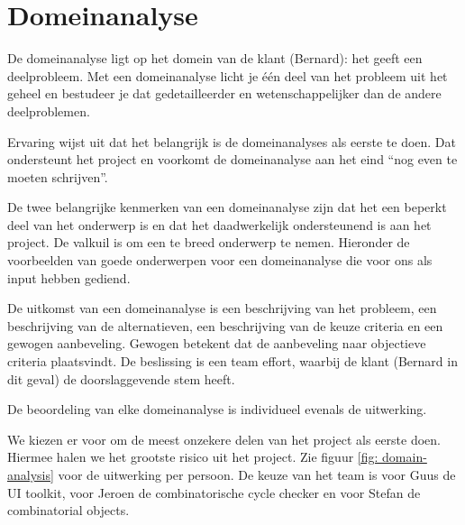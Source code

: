 
\section{Domeinanalyse}

De domeinanalyse ligt op het domein van de klant (Bernard): het geeft een deelprobleem. Met een domeinanalyse licht je
\'e\'en deel van het probleem uit het geheel en bestudeer je dat gedetailleerder en wetenschappelijker dan de andere deelproblemen.

Ervaring wijst uit dat het belangrijk is de domeinanalyses als eerste te doen. Dat ondersteunt het project en voorkomt
de domeinanalyse aan het eind ``nog even te moeten schrijven''.

De twee belangrijke kenmerken van een domeinanalyse zijn dat het een beperkt deel van het onderwerp is en dat het daadwerkelijk
ondersteunend is aan het project. De valkuil is om een te breed onderwerp te nemen. Hieronder de voorbeelden van goede onderwerpen
voor een domeinanalyse die voor ons als input hebben gediend.

De uitkomst van een domeinanalyse is een beschrijving van het probleem,
een beschrijving van de alternatieven, een beschrijving van de keuze criteria en
een gewogen aanbeveling. Gewogen betekent dat de aanbeveling naar objectieve criteria plaatsvindt.
De beslissing is een team effort, waarbij de klant (Bernard in dit geval)
de doorslaggevende stem heeft.

De beoordeling van elke domeinanalyse is individueel evenals de uitwerking.

We kiezen er voor om de meest onzekere delen van het project als eerste doen. Hiermee halen we het grootste risico uit het
project. Zie figuur \ref{fig: domain-analysis} voor de uitwerking per persoon.
De keuze van het team is voor Guus de UI toolkit, voor Jeroen de combinatorische cycle checker en voor Stefan de combinatorial objects.

